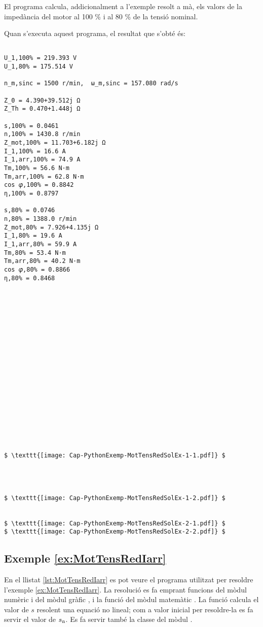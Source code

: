 El programa calcula, addicionalment a l'exemple resolt a mà, els valors de la impedància del motor al 100 \% i al 80 \% de la tensió nominal.

Quan s'executa aquest programa, el resultat que s'obté és:
\lstset{
	language=,
	numbers=none,
	frame=none
}
\begin{lstlisting}[mathescape=true]
	
U_1,100% = 219.393 V
U_1,80% = 175.514 V

n_m,sinc = 1500 r/min,  ω_m,sinc = 157.080 rad/s

Z_0 = 4.390+39.512j Ω
Z_Th = 0.470+1.448j Ω

s,100% = 0.0461
n,100% = 1430.8 r/min
Z_mot,100% = 11.703+6.182j Ω
I_1,100% = 16.6 A
I_1,arr,100% = 74.9 A
Tm,100% = 56.6 N·m
Tm,arr,100% = 62.8 N·m
cos 𝜑,100% = 0.8842
η,100% = 0.8797

s,80% = 0.0746
n,80% = 1388.0 r/min
Z_mot,80% = 7.926+4.135j Ω
I_1,80% = 19.6 A
I_1,arr,80% = 59.9 A
Tm,80% = 53.4 N·m
Tm,arr,80% = 40.2 N·m
cos 𝜑,80% = 0.8866
η,80% = 0.8468




















$ \texttt{[image: Cap-PythonExemp-MotTensRedSolEx-1-1.pdf]} $




$ \texttt{[image: Cap-PythonExemp-MotTensRedSolEx-1-2.pdf]} $


$ \texttt{[image: Cap-PythonExemp-MotTensRedSolEx-2-1.pdf]} $
$ \texttt{[image: Cap-PythonExemp-MotTensRedSolEx-2-2.pdf]} $
\end{lstlisting} 



\hypertarget{exemple:MotTensRedIarr}{\subsection{Exemple \ref*{ex:MotTensRedIarr} \MotTensRedIarr}}
En el llistat \vref{lst:MotTensRedIarr} es pot veure el programa utilitzat per resoldre l'exemple \vref{ex:MotTensRedIarr}. La resolució es fa emprant funcions del mòdul numèric  i del mòdul gràfic , i la funció  del mòdul matemàtic . La funció  calcula el valor de $s$ resolent una equació no lineal; com a valor inicial per resoldre-la  es fa servir el valor de $s_\mathrm{n}$. Es fa servir també la classe  del mòdul .


